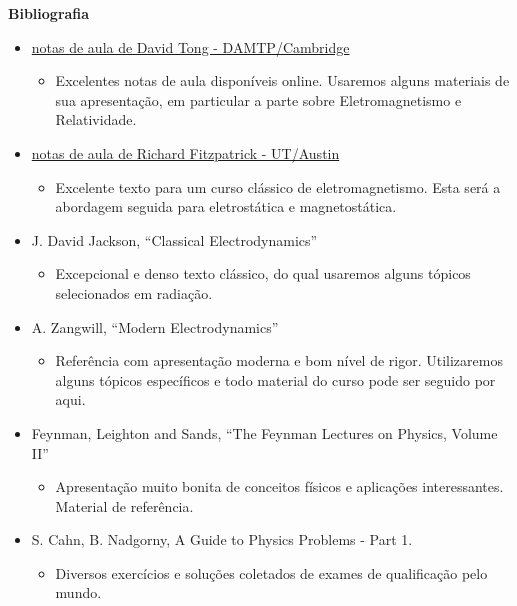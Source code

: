 \begin{framed}
\textbf{Bibliografia}\\
\begin{itemize}
\item \href{https://www.damtp.cam.ac.uk/user/tong/em.html}{notas de aula de David Tong - DAMTP/Cambridge}\begin{itemize}
\item Excelentes notas de aula disponíveis online. Usaremos alguns materiais de sua apresentação, em particular a parte sobre Eletromagnetismo e Relatividade.
\end{itemize}


\item \href{https://farside.ph.utexas.edu/teaching/jk1/jk1.html}{notas de aula de Richard Fitzpatrick - UT/Austin}\begin{itemize}
\item Excelente texto para um curso clássico de eletromagnetismo. Esta será a abordagem seguida para eletrostática e magnetostática.
\end{itemize}


\item J. David Jackson, ``Classical Electrodynamics''\begin{itemize}
\item Excepcional e denso texto clássico, do qual usaremos alguns tópicos selecionados em radiação.
\end{itemize}


\item A. Zangwill, ``Modern Electrodynamics''\begin{itemize}
\item Referência com apresentação moderna e bom nível de rigor. Utilizaremos alguns tópicos específicos e todo material do curso pode ser seguido por aqui.
\end{itemize}


\item Feynman, Leighton and Sands, ``The Feynman Lectures on Physics, Volume II''\begin{itemize}
\item Apresentação muito bonita de conceitos físicos e aplicações interessantes. Material de referência.
\end{itemize}


\item S. Cahn, B. Nadgorny, A Guide to Physics Problems - Part 1.\begin{itemize}
\item Diversos exercícios e soluções coletados de exames de qualificação pelo mundo.
\end{itemize}
\end{itemize}
\end{framed}

